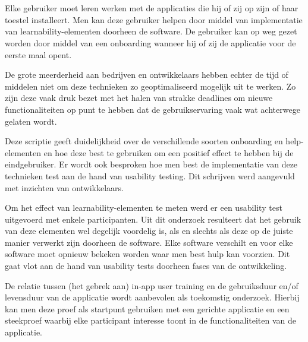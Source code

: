 
\chapter*{}

Elke gebruiker moet leren werken met de applicaties die hij of zij op zijn of haar toestel installeert. Men kan deze gebruiker helpen door middel van implementatie van learnability-elementen doorheen de software. De gebruiker kan op weg gezet worden door middel van een onboarding wanneer hij of zij de applicatie voor de eerste maal opent.

De grote meerderheid aan bedrijven en ontwikkelaars hebben echter de tijd of middelen niet om deze technieken zo geoptimaliseerd mogelijk uit te werken. Zo zijn deze vaak druk bezet met het halen van strakke deadlines om nieuwe functionaliteiten op punt te hebben dat de gebruikservaring vaak wat achterwege gelaten wordt.

Deze scriptie geeft duidelijkheid over de verschillende soorten onboarding en help-elementen en hoe deze best te gebruiken om een positief effect te hebben bij de eindgebruiker. Er wordt ook besproken hoe men best de implementatie van deze technieken test aan de hand van usability testing. Dit schrijven werd aangevuld met inzichten van ontwikkelaars.

Om het effect van learnability-elementen te meten werd er een usability test uitgevoerd met enkele participanten. Uit dit onderzoek resulteert dat het gebruik van deze elementen wel degelijk voordelig is, als en slechts als deze op de juiste manier verwerkt zijn doorheen de software. Elke software verschilt en voor elke software moet opnieuw bekeken worden waar men best hulp kan voorzien. Dit gaat vlot aan de hand van usability tests doorheen fases van de ontwikkeling.

De relatie tussen (het gebrek aan) in-app user training en de gebruiksduur en/of levensduur van de applicatie wordt aanbevolen als toekomstig onderzoek. Hierbij kan men deze proef als startpunt gebruiken met een gerichte applicatie en een steekproef waarbij elke participant interesse toont in de functionaliteiten van de applicatie.
